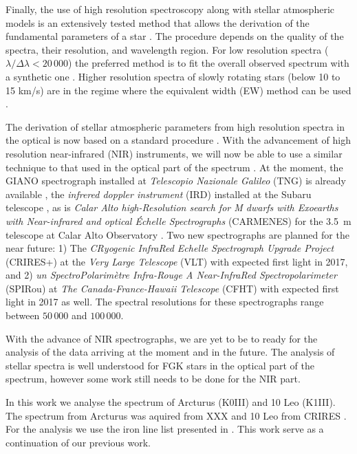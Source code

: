 \documentclass{aa}
\begin{document}
Finally, the use of high resolution spectroscopy along with stellar atmospheric
models is an extensively tested method that allows the derivation of the
fundamental parameters of a star \citep[see e.g.][]{Valenti2005,Santos13}. The
procedure depends on the quality of the spectra, their resolution, and
wavelength region. For low resolution spectra ($\lambda/\Delta\lambda <
20\,000$) the preferred method is to fit the overall observed spectrum with a
synthetic one \citep[see e.g.][]{Recio2006}. Higher resolution spectra of slowly
rotating stars (below 10 to 15 \si{km/s})  are in the regime where the
equivalent width (EW) method can be used
\citep[see e.g.][for details]{Andreasen2017}.

The derivation of stellar atmospheric parameters from high resolution spectra in
the optical is now based on a standard procedure
\citep[see e.g.][]{Valenti2005,Sousa2008a}. With the advancement of high
resolution near-infrared (NIR) instruments, we will now be able to use a similar
technique to that used in the optical part of the spectrum
\citep[see e.g.][]{Melendez1999,Sousa2008a,Tsantaki2013,Mucciarelli2013,Bensby2014}.
At the moment, the GIANO spectrograph installed at \emph{Telescopio Nazionale
Galileo} (TNG) is already available \citep{GIANO}, the \emph{infrered doppler
instrument} (IRD) installed at the Subaru telescope \citep{IRD}, as is
\emph{Calar Alto high-Resolution search for M dwarfs with Exoearths with
Near-infrared and optical Échelle Spectrographs} (CARMENES) for the \SI{3.5}{m}
telescope at Calar Alto Observatory \citep{CARMENES}. Two new spectrographs are
planned for the near future: 1) The \emph{CRyogenic InfraRed Echelle
Spectrograph Upgrade Project} (CRIRES+) at the \emph{Very Large Telescope} (VLT)
\citep{CRIRESp} with expected first light in 2017, and 2) \emph{un
SpectroPolarimètre Infra-Rouge A Near-InfraRed Spectropolarimeter} (SPIRou) at
\emph{The Canada-France-Hawaii Telescope} (CFHT) \citep{SPIROU1,SPIROU2} with
expected first light in 2017 as well. The spectral resolutions for these
spectrographs range between $50\,000$ and $100\,000$.

With the advance of NIR spectrographs, we are yet to be to ready for the
analysis of the data arriving at the moment and in the future. The analysis of
stellar spectra is well understood for FGK stars in the optical part of the
spectrum, however some work still needs to be done for the NIR part.

In this work we analyse the spectrum of Arcturus (K0III) and 10 Leo (K1III). The
spectrum from Arcturus was aquired from XXX and 10 Leo from CRIRES
\citep{Nicholls2016}. For the analysis we use the iron line list presented in
\citet{Andreasen2016}. This work serve as a continuation of our previous work.
\end{document}
